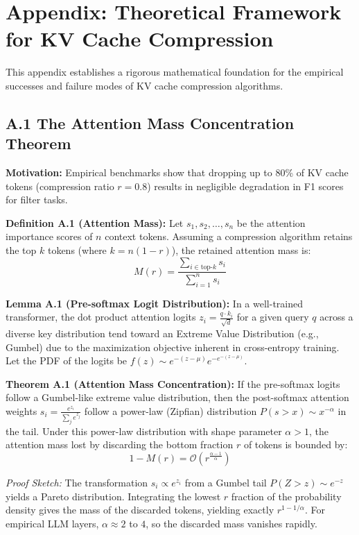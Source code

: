 \documentclass[10pt,a4paper]{article}
\begin{document}
\section*{Appendix: Theoretical Framework for KV Cache Compression}

This appendix establishes a rigorous mathematical foundation for the empirical successes and failure modes of KV cache compression algorithms.

\subsection*{A.1 The Attention Mass Concentration Theorem}

\textbf{Motivation:} Empirical benchmarks show that dropping up to 80\% of KV cache tokens (compression ratio $r=0.8$) results in negligible degradation in F1 scores for filter tasks.

\textbf{Definition A.1 (Attention Mass):} Let $s_1, s_2, \dots, s_n$ be the attention importance scores of $n$ context tokens. Assuming a compression algorithm retains the top $k$ tokens (where $k = n(1-r)$), the retained attention mass is:
\begin{equation}
M(r) = \frac{\sum_{i \in \text{top-}k} s_i}{\sum_{i=1}^{n} s_i}
\end{equation}

\textbf{Lemma A.1 (Pre-softmax Logit Distribution):} In a well-trained transformer, the dot product attention logits $z_i = \frac{q \cdot k_i}{\sqrt{d}}$ for a given query $q$ across a diverse key distribution tend toward an Extreme Value Distribution (e.g., Gumbel) due to the maximization objective inherent in cross-entropy training. Let the PDF of the logits be $f(z) \sim e^{-(z - \mu)} e^{-e^{-(z - \mu)}}$.

\textbf{Theorem A.1 (Attention Mass Concentration):} 
If the pre-softmax logits follow a Gumbel-like extreme value distribution, then the post-softmax attention weights $s_i = \frac{e^{z_i}}{\sum_j e^{z_j}}$ follow a power-law (Zipfian) distribution $P(s > x) \sim x^{-\alpha}$ in the tail.
Under this power-law distribution with shape parameter $\alpha > 1$, the attention mass lost by discarding the bottom fraction $r$ of tokens is bounded by:
\begin{equation}
1 - M(r) = \mathcal{O}\left(r^{\frac{\alpha - 1}{\alpha}}\right)
\end{equation}

\textit{Proof Sketch:}
The transformation $s_i \propto e^{z_i}$ from a Gumbel tail $P(Z > z) \sim e^{-z}$ yields a Pareto distribution. Integrating the lowest $r$ fraction of the probability density gives the mass of the discarded tokens, yielding exactly $r^{1 - 1/\alpha}$. For empirical LLM layers, $\alpha \approx 2$ to $4$, so the discarded mass vanishes rapidly.
\end{document}
